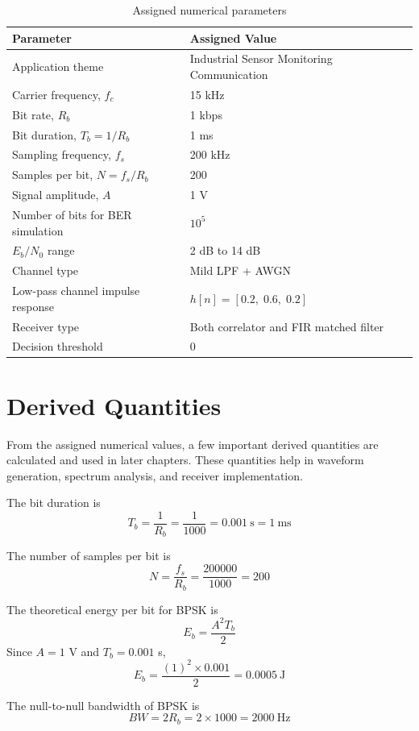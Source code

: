 \begin{table}[H]
\centering
\caption{Assigned numerical parameters}
\label{tab:batch9params}
\begin{tabular}{|l|l|}
\hline
\textbf{Parameter} & \textbf{Assigned Value} \\
\hline
Application theme & Industrial Sensor Monitoring Communication \\
\hline
Carrier frequency, \(f_c\) & 15 kHz \\
\hline
Bit rate, \(R_b\) & 1 kbps \\
\hline
Bit duration, \(T_b = 1/R_b\) & 1 ms \\
\hline
Sampling frequency, \(f_s\) & 200 kHz \\
\hline
Samples per bit, \(N = f_s/R_b\) & 200 \\
\hline
Signal amplitude, \(A\) & 1 V \\
\hline
Number of bits for BER simulation & \(10^5\) \\
\hline
\(E_b/N_0\) range & 2 dB to 14 dB \\
\hline
Channel type & Mild LPF + AWGN \\
\hline
Low-pass channel impulse response & \(h[n] = [0.2,\;0.6,\;0.2]\) \\
\hline
Receiver type & Both correlator and FIR matched filter \\
\hline
Decision threshold & 0 \\
\hline
\end{tabular}
\end{table}

\section{Derived Quantities}
From the assigned numerical values, a few important derived quantities are calculated and used in later chapters. 
These quantities help in waveform generation, spectrum analysis, and receiver implementation.

The bit duration is
\[
T_b = \frac{1}{R_b} = \frac{1}{1000} = 0.001~\text{s} = 1~\text{ms}
\]

The number of samples per bit is
\[
N = \frac{f_s}{R_b} = \frac{200000}{1000} = 200
\]

The theoretical energy per bit for BPSK is
\[
E_b = \frac{A^2 T_b}{2}
\]
Since \(A = 1\) V and \(T_b = 0.001\) s,
\[
E_b = \frac{(1)^2 \times 0.001}{2} = 0.0005~\text{J}
\]

The null-to-null bandwidth of BPSK is
\[
BW = 2R_b = 2 \times 1000 = 2000~\text{Hz}
\]

